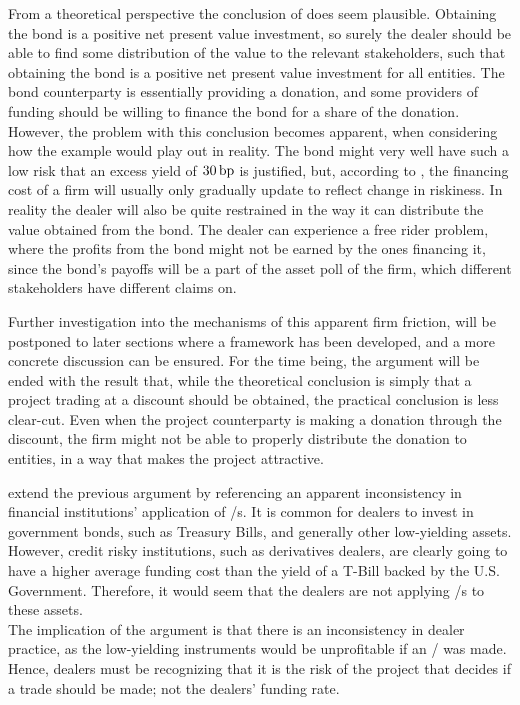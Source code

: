 \documentclass[main.tex]{subfiles}
\begin{document}
            From a theoretical perspective the conclusion of \textcite{HullWhite2012FVA} does seem plausible. 
            Obtaining the bond is a positive net present value investment, 
            so surely the dealer should be able to find some distribution of the value to the relevant stakeholders, 
            such that obtaining the bond is a positive net present value investment for all entities.
            The bond counterparty is essentially providing a donation, 
            and some providers of funding should be willing to finance the bond for a share of the donation.
            However, the problem with this conclusion becomes apparent,
            when considering how the example would play out in reality. 
            The bond might very well have such a low risk that an excess yield of $30\,\text{bp}$ is justified, 
            but, according to \textcite{Castagna2012FVA}, 
            the financing cost of a firm will usually only gradually update to reflect change in riskiness.
            In reality the dealer will also be quite restrained 
            in the way it can distribute the value obtained from the bond.
            The dealer can experience a free rider problem, 
            where the profits from the bond might not be earned by the ones financing it,
            since the bond's payoffs will be a part of the asset poll of the firm,
            which different stakeholders have different claims on.

            Further investigation into the mechanisms of this apparent firm friction,
            will be postponed to later sections where a framework has been developed,
            and a more concrete discussion can be ensured.  
            For the time being, the argument will be ended with the result that, 
            while the theoretical conclusion is simply that a project trading at a discount should be obtained,
            the practical conclusion is less clear-cut.
            Even when the project counterparty is making a donation through the discount,
            the firm might not be able to properly distribute the donation to entities,
            in a way that makes the project attractive.

            \textcite{HullWhite2012FVA} extend the previous argument by referencing 
            an apparent inconsistency in financial institutions' application of \FVA/s.
            It is common for dealers to invest in government bonds, such as Treasury Bills,
            and generally other low-yielding assets.
            However, credit risky institutions, such as derivatives dealers, are clearly going to have
            a higher average funding cost than the yield of a T-Bill backed by the U.S. Government.
            Therefore, it would seem that the dealers are not applying \FVA/s to these assets.
            \\
            The implication of the argument is that there is an inconsistency in dealer practice,
            as the low-yielding instruments would be unprofitable if an \FVA/ was made.
            Hence, dealers must be recognizing that it is 
            the risk of the project that decides if a trade should be made; 
            not the dealers' funding rate.
\end{document}
